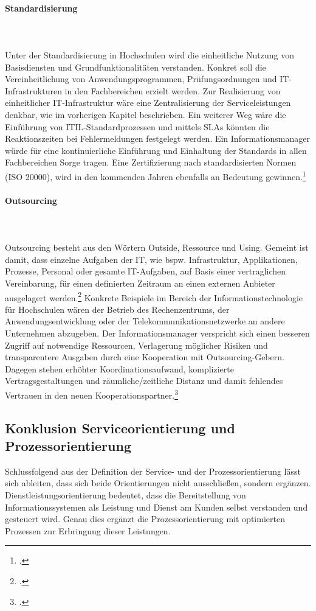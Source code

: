 \paragraph{Standardisierung}\mbox{}\\\\
\label{paragraph_standardisierung}
Unter der Standardisierung in Hochschulen wird die einheitliche Nutzung von Basisdiensten und Grundfunktionalitäten verstanden. Konkret soll die Vereinheitlichung von Anwendungsprogrammen, Prüfungsordnungen und IT-Infrastrukturen in den Fachbereichen erzielt werden. Zur Realisierung von einheitlicher IT-Infrastruktur wäre eine Zentralisierung der Serviceleistungen denkbar, wie im vorherigen Kapitel beschrieben. Ein weiterer Weg wäre die Einführung von ITIL-Standardprozessen und mittels SLAs könnten die Reaktionszeiten bei Fehlermeldungen festgelegt werden. Ein Informationsmanager würde für eine kontinuierliche Einführung und Einhaltung der Standards in allen Fachbereichen Sorge tragen. Eine Zertifizierung nach standardisierten Normen (ISO 20000), wird in den kommenden Jahren ebenfalls an Bedeutung gewinnen.\footcite[Vgl.][168]{breiter_implementierung_2011}


\paragraph{Outsourcing}\mbox{}\\\\
\label{paragraph_outsourcing}
Outsourcing besteht aus den Wörtern \glqq Outside\grqq{}, \glqq Ressource\grqq{} und \glqq Using\grqq{}. Gemeint ist damit, dass einzelne Aufgaben der IT, wie bspw. Infrastruktur, Applikationen, Prozesse, Personal oder gesamte IT-Aufgaben, auf Basis einer vertraglichen Vereinbarung, für einen definierten Zeitraum an einen externen Anbieter ausgelagert werden.\footcite[Vgl.][164]{krcmar_einfuhrung_2015} Konkrete Beispiele im Bereich der Informationstechnologie für Hochschulen wären der Betrieb des Rechenzentrums, der Anwendungsentwicklung oder der Telekommunikationsnetzwerke an andere Unternehmen abzugeben. Der Informationsmanager verspricht sich einen besseren Zugriff auf notwendige Ressourcen, Verlagerung möglicher Risiken und transparentere Ausgaben durch eine Kooperation mit Outsourcing-Gebern. Dagegen stehen erhöhter Koordinationsaufwand, komplizierte Vertragsgestaltungen und räumliche/zeitliche Distanz und damit fehlendes Vertrauen in den neuen Kooperationspartner.\footcite[Vgl.][195 ff.]{barthelemy_2001}

\subsection{Konklusion Serviceorientierung und Prozessorientierung}
Schlussfolgend aus der Definition der Service- und der Prozessorientierung lässt 
sich ableiten, dass sich beide Orientierungen nicht ausschließen, sondern 
ergänzen.  Dienstleistungsorientierung bedeutet, dass die Bereitstellung von 
Informationssystemen als Leistung und Dienst am Kunden selbst verstanden und 
gesteuert wird. Genau dies ergänzt die Prozessorientierung mit optimierten 
Prozessen zur Erbringung dieser Leistungen. 

